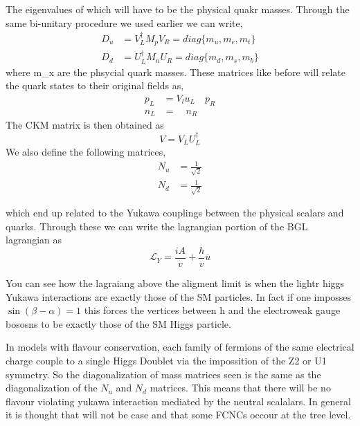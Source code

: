 The eigenvalues of which will have to be the physical quakr masses. Through the same bi-unitary procedure we used earlier we can write, 
\begin{equation}
\begin{split}
D_u & = V_L^\dagger M_p V_R = diag\{ m_u , m_c ,  m_t \} \\
D_d & = U_L^\dagger M_n U_R = diag\{ m_d , m_s , m_b \}  
\end{split} 
\end{equation}
where m_x are the phsycial quark masses. These matrices like before will relate the quark states to their original fields as, 
\begin{equation}
\begin{split}
p_L & = V_l u_L \quad p_R \\
n_L & = \quad n_R 
\end{split} 
\end{equation}
The CKM matrix is then obtained as 
\begin{equation}
V= V_L U_L^\dagger
\end{equation}
We also define the following matrices, 
\begin{equation}
\begin{split}
N_u & = \frac{1}{\sqrt{2}} \\ 
N_d & = \frac{1}{\sqrt{2}}
\end{split} 
\end{equation}

which end up related to the Yukawa couplings between the physical scalars and quarks. Through these we can write the lagrangian portion of the BGL lagrangian as 
\begin{equation}
\mathcal{L}_Y = \frac{i A}{v} + \frac{h}{v} \overline{u}
\end{equation}

You can see how the lagraiang above the aligment limit is when the lightr higgs Yukawa interactions are exactly those of the SM particles. In fact if one imposses $\sin(\beta -\alpha) = 1$ this forces the vertices between h and the electroweak gauge bososns to be exactly those of the SM Higgs particle. 

In models with flavour conservation, each family  of fermions of the same electrical charge couple to a single Higgs Doublet via the impossition of the Z2 or U1 symmetry. So the diagonalization of mass matrices seen is the same as the diagonalization of the $N_u$ and $N_d$ matrices. This means that there will be no flavour violating yukawa interaction mediated by the neutral scalalars. In general it is thought that will not be case and that some FCNCs occour at the tree level. 

